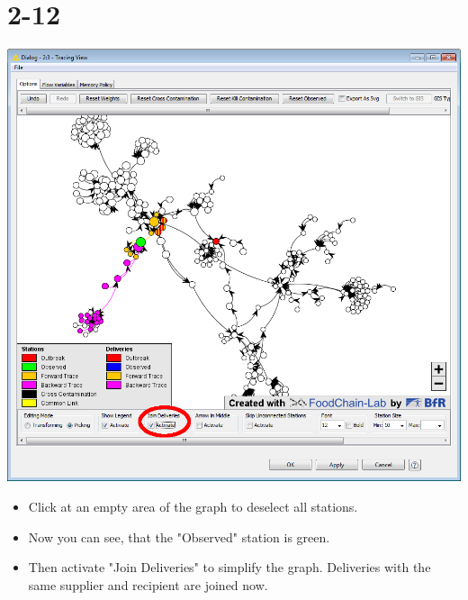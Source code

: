 \documentclass[10pt]{beamer}
\begin{document}
\section{2-12}
\begin{frame}
	\begin{center}
  		\includegraphics[height=0.6\textheight]{2-12.png}
	\end{center}
	\begin{itemize}
		\item Click at an empty area of the graph to deselect all stations.
		\item Now you can see, that the "Observed" station is green.
		\item Then activate "Join Deliveries" to simplify the graph. Deliveries with the same supplier and recipient are joined now.
	\end{itemize}
\end{frame}
\end{document}
